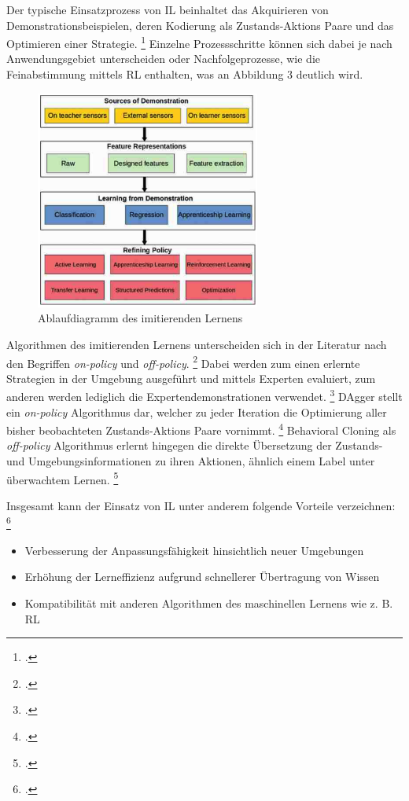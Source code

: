Der typische Einsatzprozess von IL beinhaltet das Akquirieren von Demonstrationsbeispielen, deren Kodierung als Zustands-Aktions Paare und das Optimieren einer Strategie. \footcite[Vgl.][S. 3]{Hussein.2017}
Einzelne Prozessschritte können sich dabei je nach Anwendungsgebiet unterscheiden oder Nachfolgeprozesse, wie die Feinabstimmung mittels RL enthalten, was an Abbildung 3 deutlich wird.
\begin{figure}[htb]
    \centering
    \includegraphics[height=7.2cm]{lib/graphics/IL flowchart.png}
    \caption[Ablaufdiagramm des imitierenden Lernens]{Ablaufdiagramm des imitierenden Lernens\footnotemark}
    \label{abb:IL-process-flowchart}
\end{figure}

Algorithmen des imitierenden Lernens unterscheiden sich in der Literatur nach den Begriffen \textit{on-policy} und \textit{off-policy}. \footcite[Vgl.][S. 3]{Ashwin.2020}
Dabei werden zum einen erlernte Strategien in der Umgebung ausgeführt und mittels Experten evaluiert, zum anderen werden lediglich die Expertendemonstrationen verwendet. \footcite[Vgl.][S. 3]{Ashwin.2020}
DAgger stellt ein \textit{on-policy} Algorithmus dar, welcher zu jeder Iteration die Optimierung aller bisher beobachteten Zustands-Aktions Paare vornimmt. \footcite[Vgl.][S. 5]{attia.2018}
Behavioral Cloning als \textit{off-policy} Algorithmus erlernt hingegen die direkte Übersetzung der Zustands- und Umgebungsinformationen zu ihren Aktionen, ähnlich einem Label unter überwachtem Lernen. \footcite[Vgl.][S. 4]{fang.2019}

Insgesamt kann der Einsatz von IL unter anderem folgende Vorteile verzeichnen: \footcite[Vgl.][S. 1]{fang.2019}
\begin{itemize}
    \item Verbesserung der Anpassungsfähigkeit hinsichtlich neuer Umgebungen
    \item Erhöhung der Lerneffizienz aufgrund schnellerer Übertragung von Wissen
    \item Kompatibilität mit anderen Algorithmen des maschinellen Lernens wie z. B. RL
\end{itemize}

